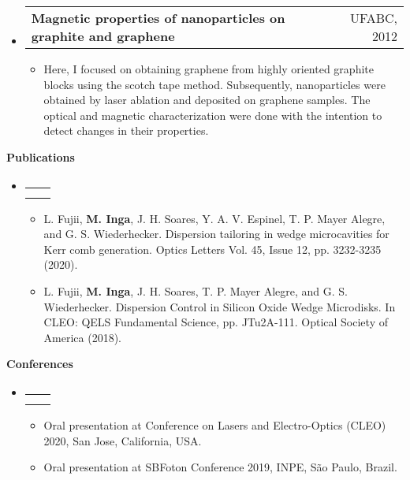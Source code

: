 \documentclass[letterpaper,12pt]{article}[leftmargin=*]
\makeatletter
\def \entryspacing {-0pt}
\renewcommand{\section}[2]{\vspace{5pt}
  \colorbox{secondary}{\color{white}\raggedbottom\normalsize\textbf{{#1}{\hspace{7pt}#2}}}
}
\newcommand{\resumeEntryStart}{\begin{itemize}[leftmargin=2.5mm]}
\newcommand{\resumeEntryEnd}{\end{itemize}\vspace{\entryspacing}}
\newcommand{\resumeItemListStart}{\begin{itemize}[leftmargin=4.5mm]}
\newcommand{\resumeItemListEnd}{\end{itemize}}
\newcommand{\resumeItem}[1]{
  \item\small{
    {#1 \vspace{-2pt}}
  }
}
\newcommand{\resumeEntryTSDL}[4]{
  \vspace{-1pt}\item[]
    \begin{tabularx}{0.97\textwidth}{X@{\hspace{60pt}}r}
      \textbf{\color{primary}#1} & {\firabook\color{accent}\small#2} \\
      \textit{\color{accent}\small#3} & \textit{\color{accent}\small#4} \\
    \end{tabularx}\vspace{-6pt}
}
\newcommand{\resumeEntryTD}[2]{
  \vspace{-1pt}\item[]
    \begin{tabularx}{0.97\textwidth}{X@{\hspace{60pt}}r}
      \textbf{\color{primary}#1} & {\firabook\color{accent}\small#2} \\
    \end{tabularx}\vspace{-6pt}
}
\makeatother
\begin{document}
\vspace{-0.5cm}

\resumeEntryStart
\resumeEntryTD
{Magnetic properties of \ce{CuO2} nanoparticles on graphite and graphene}{UFABC, 2012}
\resumeItemListStart
\resumeItem {Here, I focused on obtaining graphene from highly oriented graphite blocks using the scotch tape method. Subsequently, nanoparticles were obtained by laser ablation and deposited on graphene samples. The optical and magnetic characterization were done with the intention to detect changes in their properties.}

\resumeItemListEnd
\resumeEntryEnd

\vspace{-0.3cm}

\section{\faBarChart}{Publications}
\vspace{-1.3cm}

\resumeEntryStart
\resumeEntryTSDL
{}{}
{}{}
\resumeItemListStart
\resumeItem {L. Fujii, \textbf{M. Inga}, J. H. Soares, Y. A. V. Espinel, T. P. Mayer Alegre, and G. S. Wiederhecker. Dispersion tailoring in wedge microcavities for Kerr comb generation. Optics Letters Vol. 45, Issue 12, pp. 3232-3235 (2020). \href{https://www.osapublishing.org/ol/abstract.cfm?uri=ol-45-12-3232}{\faExternalLink}}
\resumeItem{L. Fujii, \textbf{M. Inga}, J. H. Soares, T. P. Mayer Alegre, and G. S. Wiederhecker. Dispersion Control in Silicon Oxide Wedge Microdisks. In CLEO: QELS Fundamental Science, pp. JTu2A-111. Optical Society of America (2018). \href{https://www.osapublishing.org/abstract.cfm?uri=CLEO_SI-2018-JTu2A.111}{\faExternalLink}}
\resumeItemListEnd
\resumeEntryEnd

\vspace{-0.3cm}


\section{\faGroup}{Conferences}
\vspace{-1.4cm}

\resumeEntryStart
\resumeEntryTSDL
{}{}
{}{}
\resumeItemListStart
\resumeItem {Oral presentation at Conference on Lasers and Electro-Optics (CLEO) 2020, San Jose, California, USA. \href{https://www.cleoconference.org/home/schedule/}{\faExternalLink}}
\resumeItem{Oral presentation at SBFoton Conference 2019, INPE, São Paulo, Brazil. \href{https://www.sbfoton.org.br/tech_sessions/}{\faExternalLink}}
\resumeItemListEnd
\resumeEntryEnd

\vspace{-0.3cm}
\end{document}
